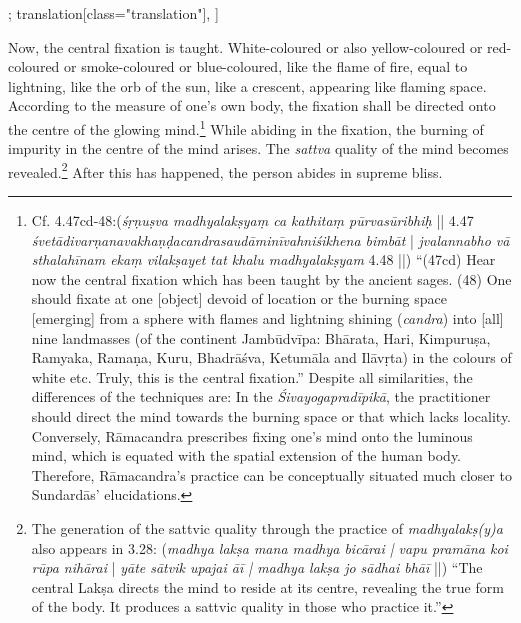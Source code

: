 \begin{alignment}[
  texts=edition[class="edition"];
  translation[class="translation"],
  ]
\begin{translation}
\begin{tlate}[p27_01]
  Now, the central fixation is taught. White-coloured or also yellow-coloured or red-coloured or smoke-coloured or blue-coloured, like the flame of fire, equal to lightning, like the orb of the sun, like a crescent, appearing like flaming space. According to the measure of one's own body, the fixation shall be directed onto the centre of the glowing mind.\footnote{Cf.  4.47cd-48:(\textit{śṛṇuṣva madhyalakṣyaṃ ca kathitaṃ pūrvasūribhiḥ} || 4.47 \textit{śvetādivarṇanavakhaṇḍacandrasaudāminīvahniśikhena bimbāt} | \textit{jvalannabho vā sthalahīnam ekaṃ vilakṣayet tat khalu madhyalakṣyam} 4.48 ||) ``(47cd) Hear now the central fixation which has been taught by the ancient sages. (48) One should fixate at one [object] devoid of location or the burning space [emerging] from a sphere with flames and lightning shining (\textit{candra}) into [all] nine landmasses (of the continent Jambūdvīpa: Bhārata, Hari, Kimpuruṣa, Ramyaka, Ramaṇa, Kuru, Bhadrāśva, Ketumāla and Ilāvṛta) in the colours of white etc. Truly, this is the central fixation.'' Despite all similarities, the differences of the techniques are: In the \textit{Śivayogapradīpikā}, the practitioner should direct the mind towards the burning space or that which lacks locality. Conversely, Rāmacandra prescribes fixing one's mind onto the luminous mind, which is equated with the spatial extension of the human body. Therefore, Rāmacandra's practice can be conceptually situated much closer to Sundardās' elucidations.}
  While abiding in the fixation, the burning of impurity in the centre of the mind arises. The \textit{sattva} quality of the mind becomes revealed.\footnote{The generation of the sattvic quality through the practice of \textit{madhyalakṣ(y)a} also appears in  3.28: (\textit{madhya lakṣa mana madhya bicārai | vapu pramāna koi rūpa nihārai} | \textit{yāte sātvik upajai āī | madhya lakṣa jo sādhai bhāī} ||) ``The central Lakṣa directs the mind to reside at its centre, revealing the true form of the body. It produces a sattvic quality in those who practice it.''} After this has happened, the person abides in supreme bliss.
\end{tlate}
  \end{translation}
\end{alignment}
\pagebreak %
